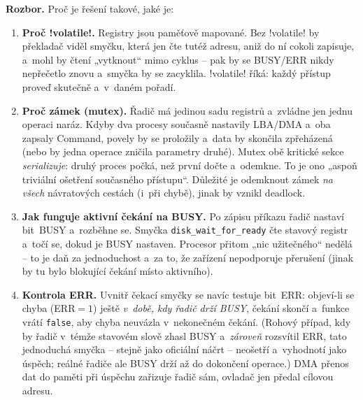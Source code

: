 \begin{priklad}
\textbf{Rozbor.} Proč je řešení takové, jaké je:
\begin{enumerate}[label=(\arabic*)]
\item \textbf{Proč \cd!volatile!.} Registry jsou paměťově mapované. Bez \cd!volatile! by překladač viděl smyčku, která jen čte tutéž adresu, aniž do ní cokoli zapisuje, a~mohl by čtení „vytknout`` mimo cyklus -- pak by se BUSY/ERR nikdy nepřečetlo znovu a~smyčka by se zacyklila. \cd!volatile! říká: každý přístup proveď skutečně a~v~daném pořadí.
\item \textbf{Proč zámek (mutex).} Řadič má jedinou sadu registrů a~zvládne jen jednu operaci naráz. Kdyby dva procesy současně nastavily LBA/DMA a~oba zapsaly Command, povely by se proložily a~data by skončila zpřeházená (nebo by jedna operace zničila parametry druhé). Mutex obě kritické sekce \emph{serializuje}: druhý proces počká, než první dočte a~odemkne. To je ono „aspoň triviální ošetření současného přístupu``. Důležité je odemknout zámek \emph{na všech} návratových cestách (i~při chybě), jinak by vznikl deadlock.
\item \textbf{Jak funguje aktivní čekání na BUSY.} Po zápisu příkazu řadič nastaví bit~BUSY a~rozběhne se. Smyčka \texttt{disk\_wait\_for\_ready} čte stavový registr a~točí se, dokud je BUSY nastaven. Procesor přitom „nic užitečného`` nedělá -- to je daň za jednoduchost a~za to, že zařízení nepodporuje přerušení (jinak by tu bylo blokující čekání místo aktivního).
\item \textbf{Kontrola ERR.} Uvnitř čekací smyčky se navíc testuje bit~ERR: objeví-li se chyba (ERR$=1$) ještě \emph{v~době, kdy řadič drží BUSY}, čekání skončí a~funkce vrátí \texttt{false}, aby chyba neuvázla v~nekonečném čekání. (Rohový případ, kdy by řadič v~témže stavovém slově zhasl BUSY a~\emph{zároveň} rozsvítil ERR, tato jednoduchá smyčka -- stejně jako oficiální náčrt -- neošetří a~vyhodnotí jako úspěch; reálné řadiče ale BUSY drží až do dokončení operace.) DMA přenos dat do paměti při úspěchu zařizuje řadič sám, ovladač jen předal cílovou adresu.
\end{enumerate}
\end{priklad}
